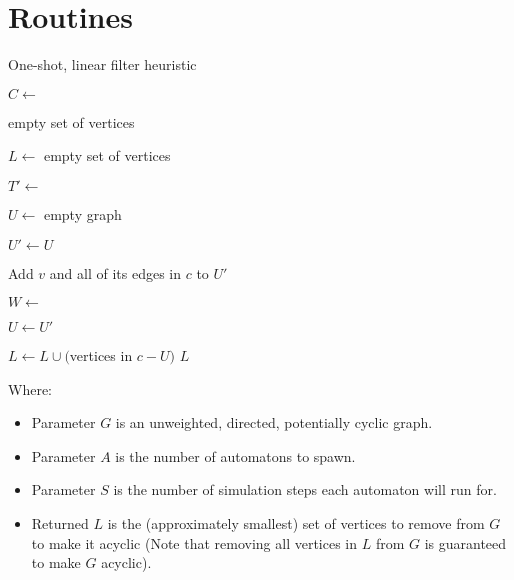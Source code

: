 \documentclass{article}
\begin{document}
\clearpage

\section*{Routines}

\begin{algorithm}
  \caption{One-shot, linear filter heuristic}\label{alg:one-shot-linear}
  \begin{algorithmic}[1]
    \State $C \gets$ 

    \State \Return empty set of vertices 
    \EndIf

    \State $L \gets$ empty set of vertices

     
    \State $T' \gets$ 

    \State $U \gets$ empty graph

    \State $U' \gets U$

    \State Add $v$ and all of its edges in $c$ to $U'$

    \State $W \gets$ 

    \State $U \gets U'$ 
    \EndIf
    \EndFor

    \State $L \gets L \cup ($vertices in $c - U)$ 
    \EndFor
    \State \Return $L$
    \EndFunction
  \end{algorithmic}
\end{algorithm}

\FloatBarrier

\noindent Where:
\begin{itemize}
  \item[] Parameter $G$ is an unweighted, directed, potentially cyclic graph.
  \item[] Parameter $A$ is the number of automatons to spawn.
  \item[] Parameter $S$ is the number of simulation steps each automaton will run for.
  \item[] Returned $L$ is the (approximately smallest) set of vertices to remove from $G$ to make it acyclic (Note that removing all vertices in $L$ from $G$ is guaranteed to make $G$ acyclic).
\end{itemize}
\end{document}
